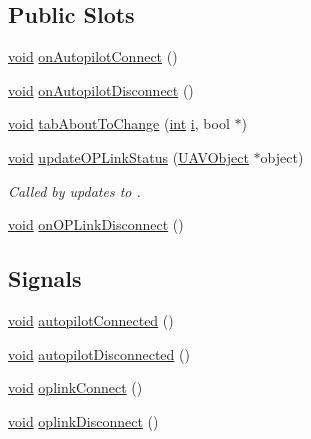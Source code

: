 \subsection*{Public Slots}
\begin{DoxyCompactItemize}
\item 
\hyperlink{group___u_a_v_objects_plugin_ga444cf2ff3f0ecbe028adce838d373f5c}{void} \hyperlink{group___config_plugin_ga4f8e913d92b646252bb6d82dfd028c52}{on\-Autopilot\-Connect} ()
\item 
\hyperlink{group___u_a_v_objects_plugin_ga444cf2ff3f0ecbe028adce838d373f5c}{void} \hyperlink{group___config_plugin_gaa57c964c58914d045daa972b9a1b87ce}{on\-Autopilot\-Disconnect} ()
\item 
\hyperlink{group___u_a_v_objects_plugin_ga444cf2ff3f0ecbe028adce838d373f5c}{void} \hyperlink{group___config_plugin_ga280d7130ca08f8974292483f6b017d72}{tab\-About\-To\-Change} (\hyperlink{ioapi_8h_a787fa3cf048117ba7123753c1e74fcd6}{int} \hyperlink{uavobjecttemplate_8m_a6f6ccfcf58b31cb6412107d9d5281426}{i}, bool $\ast$)
\item 
\hyperlink{group___u_a_v_objects_plugin_ga444cf2ff3f0ecbe028adce838d373f5c}{void} \hyperlink{group___config_plugin_ga818055c405858506c9ae07240e0bfad7}{update\-O\-P\-Link\-Status} (\hyperlink{class_u_a_v_object}{U\-A\-V\-Object} $\ast$object)
\begin{DoxyCompactList}\small\item\em Called by updates to . \end{DoxyCompactList}\item 
\hyperlink{group___u_a_v_objects_plugin_ga444cf2ff3f0ecbe028adce838d373f5c}{void} \hyperlink{group___config_plugin_gaec8bc8bcd267141edd1fee6ca08c3a97}{on\-O\-P\-Link\-Disconnect} ()
\end{DoxyCompactItemize}
\subsection*{Signals}
\begin{DoxyCompactItemize}
\item 
\hyperlink{group___u_a_v_objects_plugin_ga444cf2ff3f0ecbe028adce838d373f5c}{void} \hyperlink{group___config_plugin_ga5c7aaec226341fec654b07be4cdcd807}{autopilot\-Connected} ()
\item 
\hyperlink{group___u_a_v_objects_plugin_ga444cf2ff3f0ecbe028adce838d373f5c}{void} \hyperlink{group___config_plugin_ga1ba3ecc94d2a793f945493631cc7be34}{autopilot\-Disconnected} ()
\item 
\hyperlink{group___u_a_v_objects_plugin_ga444cf2ff3f0ecbe028adce838d373f5c}{void} \hyperlink{group___config_plugin_ga672206f813d7364dc6bd71140773c828}{oplink\-Connect} ()
\item 
\hyperlink{group___u_a_v_objects_plugin_ga444cf2ff3f0ecbe028adce838d373f5c}{void} \hyperlink{group___config_plugin_gad5ee6c6370ca04c5da447e4ba0304f0b}{oplink\-Disconnect} ()
\end{DoxyCompactItemize}

